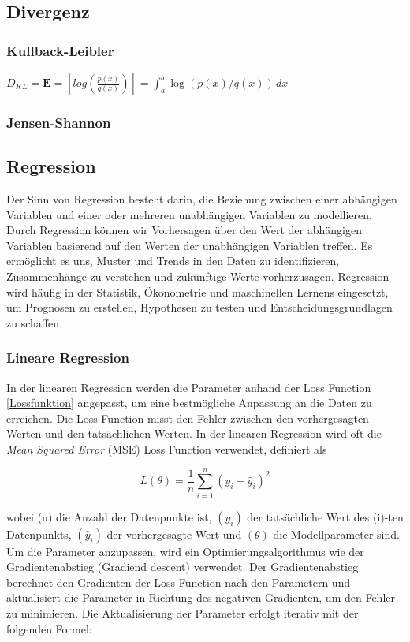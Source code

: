\documentclass[letterpaper, titlepage]{article}
\begin{document}
\subsection{Divergenz}\label{Divergenz}

\subsubsection{Kullback-Leibler}\label{Kullback-Leibler}
$D_{KL}=\mathbf{E}=[log(\frac{p(x)}{q(x)} )]= \int_{a}^{b}  \log (p(x)/q(x))\,dx  $

\subsubsection{Jensen-Shannon}\label{Jensen-Shannon}

\subsection{Regression}\label{Regression}
Der Sinn von Regression besteht darin, die Beziehung zwischen einer abhängigen Variablen und einer oder mehreren unabhängigen Variablen zu modellieren. Durch Regression können wir Vorhersagen über den Wert der abhängigen Variablen basierend auf den Werten der unabhängigen Variablen treffen. Es ermöglicht es uns, Muster und Trends in den Daten zu identifizieren, Zusammenhänge zu verstehen und zukünftige Werte vorherzusagen. Regression wird häufig in der Statistik, Ökonometrie und maschinellen Lernens eingesetzt, um Prognosen zu erstellen, Hypothesen zu testen und Entscheidungsgrundlagen zu schaffen.

\vspace{0.7cm}

\subsubsection{Lineare Regression}\label{Lineare Regression}
In der linearen Regression werden die Parameter anhand der Loss Function \ref{Lossfunktion} angepasst, um eine bestmögliche Anpassung an die Daten zu erreichen. Die Loss Function misst den Fehler zwischen den vorhergesagten Werten und den tatsächlichen Werten. In der linearen Regression wird oft die \textit{Mean Squared Error} (MSE) Loss Function verwendet, definiert als

$$L(\theta) = \frac{1}{n} \sum_{i=1}^{n} (y_i - \hat{y}_i)^2$$

wobei (n) die Anzahl der Datenpunkte ist, $(y_i)$ der tatsächliche Wert des (i)-ten Datenpunkts, $(\hat{y}_i)$ der vorhergesagte Wert und $(\theta)$ die Modellparameter sind. Um die Parameter anzupassen, wird ein Optimierungsalgorithmus wie der Gradientenabstieg (Gradiend descent) verwendet. Der Gradientenabstieg berechnet den Gradienten der Loss Function nach den Parametern und aktualisiert die Parameter in Richtung des negativen Gradienten, um den Fehler zu minimieren. Die Aktualisierung der Parameter erfolgt iterativ mit der folgenden Formel:
\end{document}
